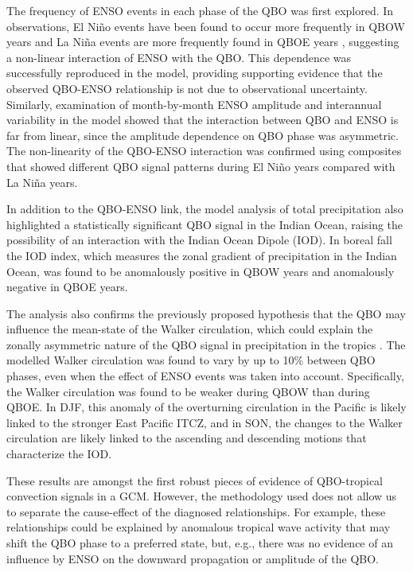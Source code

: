  

The frequency of ENSO events in each phase of the QBO was first explored. In observations, El Niño events have been found to occur more frequently in QBOW years and La Niña events are more frequently found in QBOE years \citep{taguchi2010}, suggesting a non-linear interaction of ENSO with the QBO. This dependence was successfully reproduced in the model, providing supporting evidence that the observed QBO-ENSO relationship is not due to observational uncertainty. Similarly, examination of month-by-month ENSO amplitude and interannual variability in the model showed that the interaction between QBO and ENSO is far from linear, since the amplitude dependence on QBO phase was asymmetric. The non-linearity of the QBO-ENSO interaction was confirmed using composites that showed different QBO signal patterns during El Niño years compared with La Niña years. 

In addition to the QBO-ENSO link, the model analysis of total precipitation also highlighted a statistically significant QBO signal in the Indian Ocean, raising the possibility of an interaction with the Indian Ocean Dipole (IOD). In boreal fall the IOD index, which measures the zonal gradient of precipitation in the Indian Ocean, was found to be anomalously positive in QBOW years and anomalously negative in QBOE years. 

The analysis also confirms the previously proposed hypothesis that the QBO may influence the mean-state of the Walker circulation, which could explain the zonally asymmetric nature of the QBO signal in precipitation in the tropics \citep{collimore2003,liess2012,hitchman2021observational}. The modelled Walker circulation was found to vary by up to 10\% between QBO phases, even when the effect of ENSO events was taken into account. Specifically, the Walker circulation was found to be weaker during QBOW than during QBOE. In DJF, this anomaly of the overturning circulation in the Pacific is likely linked to the stronger East Pacific ITCZ, and in SON, the changes to the Walker circulation are likely linked to the ascending and descending motions that characterize the IOD. 
 
These results are amongst the first robust pieces of evidence of QBO-tropical convection signals in a GCM. However, the methodology used does not allow us to separate the cause-effect of the diagnosed relationships. For example, these relationships could be explained by anomalous tropical wave activity that may shift the QBO phase to a preferred state, but, e.g., there was no evidence of an influence by ENSO on the downward propagation or amplitude of the QBO.  

